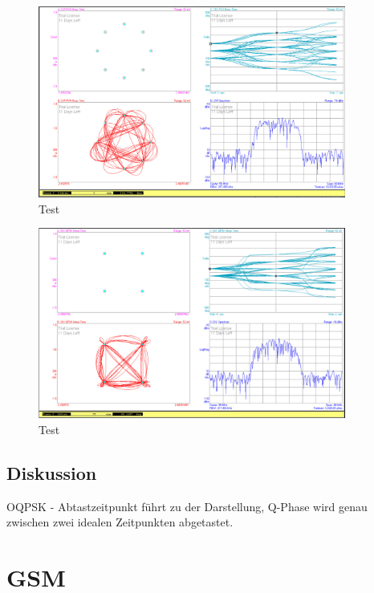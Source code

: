 \documentclass[12pt,a4paper,ngerman]{article}
\begin{document}
\pagebreak
\begin{figure}[H]
\centering
\includegraphics[width=0.9\textwidth]{figures/Aufgabe3_pi4DQPSK.jpg} 
\caption{Test}
\end{figure}

\begin{figure}[H]
\centering
\includegraphics[width=0.9\textwidth]{figures/Aufgabe3_QPSK.jpg} 
\caption{Test}
\end{figure}

\pagebreak

\subsection{Diskussion}
OQPSK - Abtastzeitpunkt führt zu der Darstellung, Q-Phase wird genau zwischen zwei idealen Zeitpunkten abgetastet. 


\pagebreak



\section{GSM}
\end{document}
